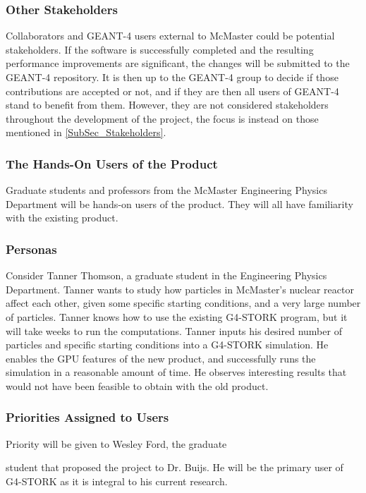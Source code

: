 \documentclass[12pt]{article}
\newcommand{\todo}[1]{\textcolor{red}{[TODO: #1]}} \else
\newcommand{\authornote}[3]{} \newcommand{\todo}[1]{} \fi
\newcommand{\ds}[1]{\authornote{blue}{DS}{#1}} %
\newcommand{\mmp}[1]{\authornote{green}{MP}{#1}}
\begin{document}
\subsubsection{Other Stakeholders}
\mmp{removed this section as suggested by peer review}

Collaborators and GEANT-4 users external to McMaster could be potential stakeholders. If the software is successfully completed and the resulting performance improvements are significant, the changes will be submitted to the GEANT-4 repository. It is then up to the GEANT-4 group to decide if those contributions are accepted or not, and if they are then all users of GEANT-4 stand to benefit from them. However, they are not considered stakeholders throughout the development of the project, the focus is instead on those mentioned in \ref{SubSec_Stakeholders}.

\subsubsection{The Hands-On Users of the Product}
Graduate students and professors from the McMaster Engineering Physics Department will be hands-on users of the product. They will all have familiarity with the existing product. 

\subsubsection{Personas}
Consider Tanner Thomson, a graduate student in the Engineering Physics Department. Tanner wants to study how particles in McMaster's nuclear reactor affect each other, given some specific starting conditions, and a very large number of particles. Tanner knows how to use the existing G4-STORK program, but it will take weeks to run the computations. Tanner inputs his desired number of particles and specific starting conditions into a G4-STORK simulation. He enables the GPU features of the new product, and successfully runs the simulation in a reasonable amount of time. He observes interesting results that would not have been feasible to obtain with the old product.\\

\subsubsection{Priorities Assigned to Users}
Priority will be given to Wesley Ford, the graduate
\ds{``graduate"} \mmp{fixed}
student that proposed the project to Dr. Buijs. He will be the primary user of G4-STORK as it is integral to his current research.
\end{document}
